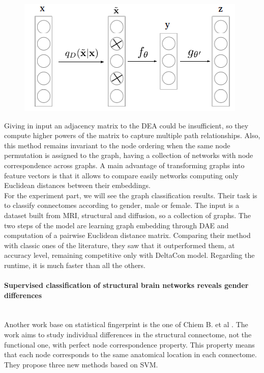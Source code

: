 \begin{figure}[htbp]
	\centering
	\includegraphics[scale=0.5]{Immagini/unsupervised2.PNG}
	\caption{\label{fig:diagram12}}
\end{figure}
 
Giving in input an adjacency matrix to the DEA could be insufficient, so they compute higher powers of the matrix to capture multiple path relationships. Also, this method remains invariant to the node ordering when the same node permutation is assigned to the graph, having a collection of networks with node correspondence across graphs. A main advantage of transforming graphs into feature vectors is that it allows to compare easily networks computing only Euclidean distances between their
embeddings.
\\

For the experiment part, we will see the graph classification results. Their task is to classify connectomes according to gender, male or female. The input is a dataset built from MRI, structural and diffusion, so a collection of graphs. The two steps of the model are learning graph embedding through DAE and computation of a pairwise Euclidean distance matrix. Comparing their method with classic ones of the literature, they saw that it outperformed them, at accuracy level, remaining competitive only with DeltaCon model. Regarding the runtime, it is much faster than all the others.
\paragraph{Supervised classification of structural brain networks reveals gender differences}\
\\

Another work base on statistical fingerprint is the one of Chiem B. et al \cite{8379106}. The work aims to study individual differences in the structural connectome, not the functional one, with perfect node correspondence property. This property means that each node corresponds to the same anatomical location in each connectome. They propose three new methods based on SVM.
\\


